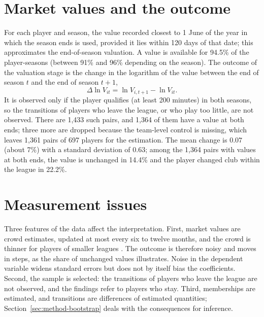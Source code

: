 \section{Market values and the outcome}
\label{sec:data-values}

For each player and season, the value recorded closest to 1 June of the year in which the season ends is used, provided it lies within 120 days of that date; this approximates the end-of-season valuation. A value is available for 94.5\% of the player-seasons (between 91\% and 96\% depending on the season). The outcome of the valuation stage is the change in the logarithm of the value between the end of season $t$ and the end of season $t+1$,
\begin{equation}
	\Delta\ln V_{it}=\ln V_{i,t+1}-\ln V_{it}.
\end{equation}
It is observed only if the player qualifies (at least 200 minutes) in both seasons, so the transitions of players who leave the league, or who play too little, are not observed. There are 1,433 such pairs, and 1,364 of them have a value at both ends; three more are dropped because the team-level control is missing, which leaves 1,361 pairs of 697 players for the estimation. The mean change is $0.07$ (about 7\%) with a standard deviation of $0.63$; among the 1,364 pairs with values at both ends, the value is unchanged in 14.4\% and the player changed club within the league in 22.2\%.

\section{Measurement issues}
\label{sec:data-measurement}

Three features of the data affect the interpretation. First, market values are crowd estimates, updated at most every six to twelve months, and the crowd is thinner for players of smaller leagues \cite{muller2017beyond}. The outcome is therefore noisy and moves in steps, as the share of unchanged values illustrates. Noise in the dependent variable widens standard errors but does not by itself bias the coefficients. Second, the sample is selected: the transitions of players who leave the league are not observed, and the findings refer to players who stay. Third, memberships are estimated, and transitions are differences of estimated quantities; Section~\ref{sec:method-bootstrap} deals with the consequences for inference.
